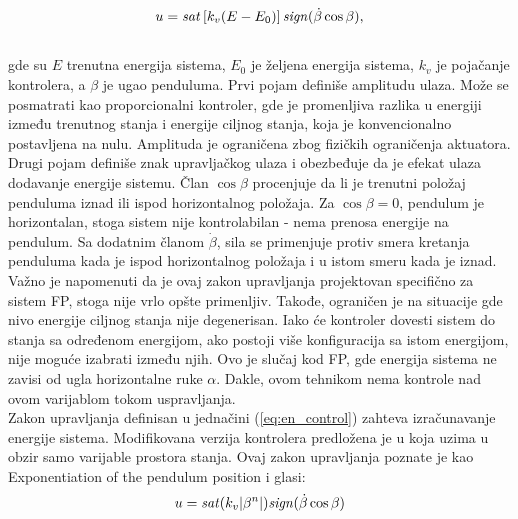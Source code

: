 \documentclass[a4paper,11pt]{article}
\theoremstyle{definition} \newtheorem{deff}{Definicija}[section]
\theoremstyle{definition} \newtheorem{prim}[deff]{Primer}
\theoremstyle{plain} \newtheorem{teor}[deff]{Teorema}
\begin{document}
	\begin{equation}
		u = \text{\textit{sat}}\left[k_v (E - E_0)\right] \text{\textit{sign}}( \dot{\beta} \cos \beta), 
		\label{eq:en_control}
	\end{equation} \\
	
	
	gde su $\textit{E}$ trenutna energija sistema, 
	$\textit{E}_0$ je željena energija sistema, $\textit{k}_v$ je pojačanje kontrolera, a $\beta$ je ugao penduluma. Prvi pojam definiše amplitudu ulaza. Može se posmatrati kao proporcionalni kontroler, gde je promenljiva razlika u energiji između trenutnog stanja i energije ciljnog stanja, koja je konvencionalno postavljena na nulu. Amplituda je ograničena zbog fizičkih ograničenja aktuatora. Drugi pojam definiše znak upravljačkog ulaza i obezbeđuje da je efekat ulaza dodavanje energije sistemu. Član $\cos \beta$ procenjuje da li je trenutni položaj penduluma iznad ili ispod horizontalnog položaja. Za $\cos \beta = 0$, pendulum je horizontalan, stoga sistem nije kontrolabilan - nema prenosa energije na pendulum. Sa dodatnim članom $\dot{\beta}$, sila se primenjuje protiv smera kretanja penduluma kada je ispod horizontalnog položaja i u istom smeru kada je iznad.\\
	
	Važno je napomenuti da je ovaj zakon upravljanja projektovan specifično za sistem FP, stoga nije vrlo opšte primenljiv. Takođe, ograničen je na situacije gde nivo energije ciljnog stanja nije degenerisan. Iako će kontroler dovesti sistem do stanja sa određenom energijom, ako postoji više konfiguracija sa istom energijom, nije moguće izabrati između njih. Ovo je slučaj kod FP, gde energija sistema ne zavisi od ugla horizontalne ruke $\alpha$. Dakle, ovom tehnikom nema kontrole nad ovom varijablom tokom uspravljanja. \\
	
	Zakon upravljanja definisan u jednačini (\ref{eq:en_control}) zahteva izračunavanje energije sistema. Modifikovana verzija kontrolera predložena je u \cite{energy_c} koja uzima u obzir samo varijable prostora stanja. Ovaj zakon upravljanja poznate je kao 
	Exponentiation of the pendulum position i glasi:\\
	
	\begin{equation}
		u = \text{\textit{sat}}(k_v |\beta^n|) \text{\textit{sign}}( \dot{\beta} \cos \beta)
	\end{equation} \\
	
\end{document}
